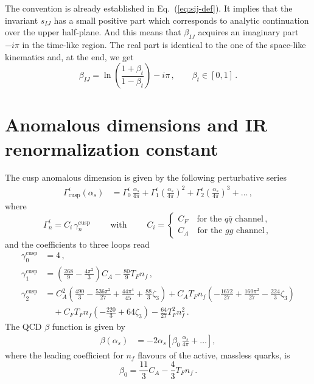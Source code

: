 \documentclass[a4paper,11pt]{article}
\newcommand{\betaIJ}{\beta_{IJ}}
\newcommand{\sIJ}{s_{IJ}}
\numberwithin{equation}{section}
\begin{document}
The convention is already established in Eq.~(\ref{eq:sij-def}).
It implies that the invariant $\sIJ$  has a small
positive part which corresponds to analytic continuation over the upper
half-plane. And this means that $\betaIJ$ acquires an imaginary part $- i \pi$
in the time-like region.
The real part is identical to the one of the space-like kinematics and, at the
end, we get
%
\begin{equation}
  \betaIJ = \ln\left(\frac{1+\beta_t}{1-\beta_t}\right) - i \pi\,,
  \qquad \beta_t \in [0,1]\,.
  \label{eq:beta34TL}
\end{equation}


\section{Anomalous dimensions and IR renormalization constant}
\label{app:AD}

The cusp anomalous dimension is  given by the following perturbative series
%
\begin{align}
  \label{eq:gammaexp}
  \Gamma_{\text{cusp}}^i(\alpha_s) &= 
  \Gamma_0^i \, \frac{\alpha_s}{4\pi} + 
  \Gamma_1^i \left( \frac{\alpha_s}{4\pi} \right)^2 + 
  \Gamma_2^i \left( \frac{\alpha_s}{4\pi} \right)^3 +
  \ldots \,, 
\end{align}
%
where
%
\begin{equation}
  \Gamma_{n}^i  =  C_i\, \gamma_{n}^\text{cusp}
  \qquad
  \text{ with }
  \qquad
  C_i =  \left\{
  \begin{array}{cc}
    C_F \quad \text{for the $q\bar q$ channel}\,, \\
    C_A \quad \text{for the $gg$ channel}\,,
  \end{array}
  \right.
\end{equation}
% 
and the coefficients to three loops read
\cite{Moch:2004pa}
%
\begin{align}
  \gamma^{\text{cusp}}_0 &= 4 \, ,
  \nonumber
  \\
  \gamma^{\text{cusp}}_1 &= \left( \frac{268}{9} - \frac{4\pi^2}{3} \right) C_A -
  \frac{80}{9} T_F n_f \, ,
  \nonumber
  \\
  \gamma^{\text{cusp}}_2 &= C_A^2 \left( \frac{490}{3} - \frac{536\pi^2}{27} +
    \frac{44\pi^4}{45} + \frac{88}{3} \zeta_3 \right) + C_A T_F n_f \left( -
    \frac{1672}{27} + \frac{160\pi^2}{27} - \frac{224}{3} \zeta_3 \right) \nonumber
  \\
  &\quad + C_F T_F n_f \left( - \frac{220}{3} + 64 \zeta_3 \right) - \frac{64}{27} T_F^2
  n_f^2 \, .
\end{align}
%
The QCD $\beta$ function is given by
%
\begin{align}
  \label{eq:betaexp}
  \beta(\alpha_s) &= -2\alpha_s \left[ \beta_0 \, \frac{\alpha_s}{4\pi} 
  + \ldots \right] ,
\end{align}
%
where the leading coefficient for $n_f$ flavours of the active, massless quarks,
is
%
\begin{equation}
  \beta_0 = \frac{11}{3} C_A - \frac{4}{3} T_F n_f \,.
  \label{eq:beta0def}
\end{equation}
\end{document}
